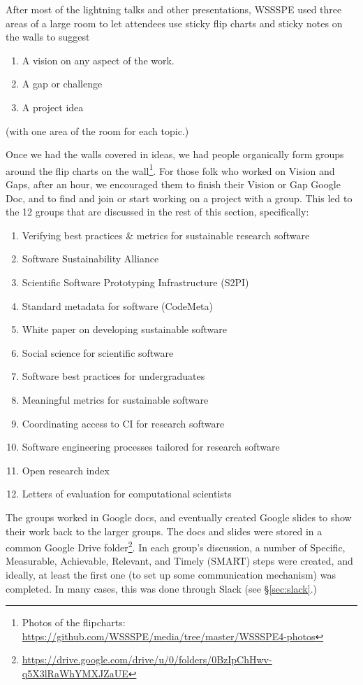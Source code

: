 \documentclass[11pt, oneside]{amsart}
\begin{document}
After most of the lightning talks and other presentations, WSSSPE used three areas of a large room to let
attendees use sticky flip charts and sticky notes on the walls to suggest
\begin{enumerate}
\item A vision on any aspect of the work.
\item A gap or challenge
\item A project idea
\end{enumerate}
(with one area of the room for each topic.)

Once we had the walls covered in ideas, we had people organically form groups around the flip charts on the wall\footnote{Photos of the flipcharts: \url{https://github.com/WSSSPE/media/tree/master/WSSSPE4-photos}}. For those folk who worked on Vision and Gaps, after an hour, we encouraged them to finish their Vision or Gap Google Doc, and to find and join or start working on a project with a group. This led to the 12 groups that are discussed in the rest of this section, specifically:
\begin{enumerate}
\item Verifying best practices \& metrics for sustainable research software
\item Software Sustainability Alliance
\item Scientific Software Prototyping Infrastructure (S2PI)
\item Standard metadata for software (CodeMeta)
\item White paper on developing sustainable software
\item Social science for scientific software
\item Software best practices for undergraduates
\item Meaningful metrics for sustainable software
\item Coordinating access to CI for research software
\item Software engineering processes tailored for research software
\item Open research index
\item Letters of evaluation for computational scientists
\end{enumerate}


The groups worked in Google docs, and eventually created Google slides to show their work back to the larger groups. The docs and slides were stored in a common Google Drive folder\footnote{\url{https://drive.google.com/drive/u/0/folders/0BzIpChHwv-q5X3lRaWhYMXJZaUE}}. In each group's discussion, a number of Specific, Measurable, Achievable, Relevant, and Timely (SMART) steps were created, and ideally, at least the first one (to set up some communication mechanism) was completed.  In many cases, this was done through Slack (see \S\ref{sec:slack}.)
\end{document}
